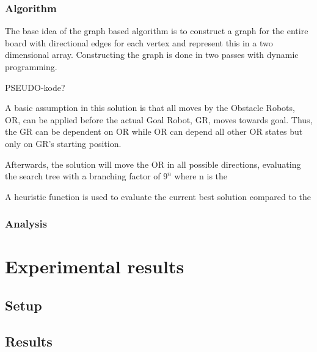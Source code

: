 \subsubsection{Algorithm}\label{algorithm-1}

The base idea of the graph based algorithm is to construct a graph for
the entire board with directional edges for each vertex and represent
this in a two dimensional array. Constructing the graph is done in two
passes with dynamic programming.

PSEUDO-kode?

A basic assumption in this solution is that all moves by the Obstacle
Robots, OR, can be applied before the actual Goal Robot, GR, moves
towards goal. Thus, the GR can be dependent on OR while OR can depend
all other OR states but only on GR's starting position.

Afterwards, the solution will move the OR in all possible directions,
evaluating the search tree with a branching factor of \(9^n\) where n is
the

A heuristic function is used to evaluate the current best solution
compared to the

\subsubsection{Analysis}\label{analysis-1}

\section{Experimental results}\label{experimental-results}

\subsection{Setup}\label{setup}

\subsection{Results}\label{results}
